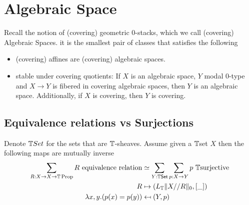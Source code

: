 \section{Algebraic Space}
Recall the notion of (covering) geometric 0-stacks, which we call (covering) Algebraic Spaces. it is the smallest pair of classes that satisfies the following
\begin{itemize}
	\item (covering) affines are (covering) algebraic spaces. %
	\item stable under covering quotients: If $X$ is an algebraic space, $Y$ modal 0-type and $X \to Y$ is fibered in covering algebraic spaces, then $Y$ is an algebraic space. Additionally, if $X$ is covering, then $Y$ is covering.
\end{itemize}
\subsection{Equivalence relations vs Surjections}

\begin{lemma}{\label{quotient-by-equivalence-relation}}
	Denote $\mathbb{T} Set$ for the sets that are $\mathbb{T}$-sheaves. Assume given a $\mathbb{T}$set  $X$ then the following maps are mutually inverse
	\begin{align*}
		\sum_{R:X\to X\to \bT\Prop} R\ \mathrm{equivalence\ relation} &\simeq \sum_{Y:\bT \mathrm{\Set}} \sum_{p:X\to Y} p\ \bT\mathrm{surjective} \\
		R &\mapsto (L_\bT \| X//R \|_0,[\_]) \\
		\lambda x,y.  (p(x)=p(y)) &\mapsfrom (Y,p) 
	\end{align*}
\end{lemma}

